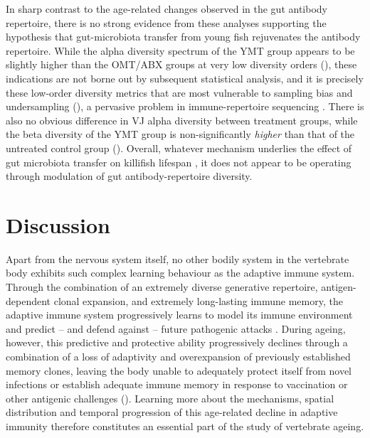 In sharp contrast to the age-related changes observed in the gut antibody repertoire, there is no strong evidence from these analyses supporting the hypothesis that gut-microbiota transfer from young fish rejuvenates the antibody repertoire. While the alpha diversity spectrum of the YMT group appears to be slightly higher than the OMT/ABX groups at very low diversity orders (), these indications are not borne out by subsequent statistical analysis, and it is precisely these low-order diversity metrics that are most vulnerable to sampling bias and undersampling (), a pervasive problem in immune-repertoire sequencing \parencite{mora2016diversity}. There is also no obvious difference in VJ alpha diversity between treatment groups, while the beta diversity of the YMT group is non-significantly \textit{higher} than that of the untreated control group (). Overall, whatever mechanism underlies the effect of gut microbiota transfer on killifish lifespan \parencite{smith2017microbiota}, it does not appear to be operating through modulation of gut antibody-repertoire diversity.

\FloatBarrier
\clearpage


\section{Discussion}
\label{sec:igseq_discussion}

Apart from the nervous system itself, no other bodily system in the vertebrate body exhibits such complex learning behaviour as the adaptive immune system. Through the combination of an extremely diverse generative repertoire, antigen-dependent clonal expansion, and extremely long-lasting immune memory, the adaptive immune system progressively learns to model its immune environment and predict -- and defend against -- future pathogenic attacks \parencite{mayer2018memory}. During ageing, however, this predictive and protective ability progressively declines through a combination of a loss of adaptivity and overexpansion of previously established memory clones, leaving the body unable to adequately protect itself from novel infections or establish adequate immune memory in response to vaccination or other antigenic challenges (). Learning more about the mechanisms, spatial distribution and temporal progression of this age-related decline in adaptive immunity therefore constitutes an essential part of the study of vertebrate ageing.

